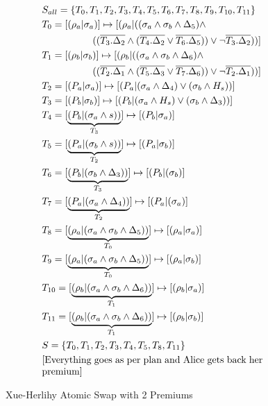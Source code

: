 \begin{figure}[hbt!]
    \centering
    \caption{Xue-Herlihy Atomic Swap with 2 Premiums}
    \label{fig:xh_swap}
\begin{align*}
    &S_{all} = \{T_0, T_1, T_2, T_3, T_4, T_5, T_6, T_7, T_8, T_9, T_{10}, T_{11}\} \\
    &T_0 = [(\rho_a |\sigma_a)] \mapsto [(\rho_a|((\sigma_a \land \sigma_b \land \Delta_5) \land \\
    &\phantomrel{======} {} ((\overline{T_3.\Delta_2} \land (\overline{T_4.\Delta_2} \lor \overline{T_6.\Delta_5})) \lor \neg \overline{T_3.\Delta_2}))] \\
    &T_1 = [(\rho_b |\sigma_b)] \mapsto [(\rho_b|((\sigma_a \land \sigma_b \land \Delta_6) \land \\
    &\phantomrel{======} {} ((\overline{T_2.\Delta_1} \land (\overline{T_5.\Delta_3} \lor \overline{T_7.\Delta_6})) \lor \neg \overline{T_2.\Delta_1}))] \\
    &T_2 = [(P_a|\sigma_a)] \mapsto [(P_a|(\sigma_a \land \Delta_4) \lor (\sigma_b \land H_{s}))] \\
    &T_3 = [(P_b|\sigma_b)] \mapsto [(P_b|(\sigma_a \land H_{s}) \lor (\sigma_b \land \Delta_3))] \\
    &T_4 = [\underbrace{(P_b|(\sigma_a \land s))}_{T_3}] \mapsto [(P_b |\sigma_a)]\\
    &T_5 = [\underbrace{(P_a|(\sigma_b \land s))}_{T_2}] \mapsto [(P_a|\sigma_b)]\\
    &T_6 = [\underbrace{(P_b|(\sigma_b \land \Delta_3))}_{T_3}] \mapsto [(P_b |(\sigma_b)] \\
    &T_7 = [\underbrace{(P_a|(\sigma_a \land \Delta_4))}_{T_2}] \mapsto [(P_a | (\sigma_a)] \\    
    &T_8 = [\underbrace{(\rho_a|(\sigma_a \land \sigma_b \land \Delta_5))}_{T_0}] \mapsto [(\rho_a | \sigma_a)]\\
    &T_9 = [\underbrace{(\rho_a|(\sigma_a \land \sigma_b \land \Delta_5))}_{T_0}] \mapsto [(\rho_a | \sigma_b)]\\
    &T_{10} = [\underbrace{(\rho_b|(\sigma_a \land \sigma_b \land \Delta_6))}_{T_1}] \mapsto [(\rho_b | \sigma_a)]\\
    &T_{11} = [\underbrace{(\rho_b|(\sigma_a \land \sigma_b \land \Delta_6))}_{T_1}] \mapsto [(\rho_b | \sigma_b)]\\
    &S = \{T_0, T_1, T_2, T_3, T_4, T_5, T_8, T_{11}\} \\
    &\text{\parbox{8cm}{[Everything goes as per plan and Alice gets back her premium]}} \\

\end{align*}
\end{figure}
